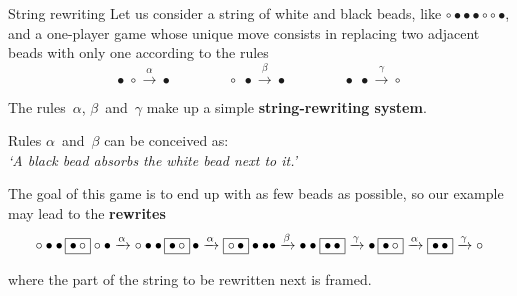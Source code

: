 %
\begin{frame}{String rewriting}
  Let us consider a string of white and black beads, like \(\circ
  \bullet \bullet \bullet \circ \circ \bullet\), and a one-player game
  whose unique move consists in replacing two adjacent beads with only
  one according to the rules
  \begin{equation*}
    \bullet \; \circ   \xrightarrow{\alpha} \bullet\qquad\qquad
    \circ   \; \bullet \xrightarrow{\beta} \bullet\qquad\qquad
    \bullet \; \bullet \xrightarrow{\gamma} \circ
  \end{equation*}

  The rules~\(\alpha\), \(\beta\)~and~\(\gamma\) make up a simple
  \textbf{string\hyp{}rewriting system}.

  \bigskip

  Rules \(\alpha\)~and~\(\beta\) can be conceived as:\\ \emph{`A black
  bead absorbs the white bead next to it.'}

  \bigskip

  The goal of this game is to end up with as few beads as possible, so
  our example may lead to the \textbf{rewrites}
  \begin{equation*}
    \circ \bullet \bullet \, \fbox{\(\bullet \, \circ\)} \circ \bullet
    \xrightarrow{\alpha} \circ \bullet \bullet \, \fbox{\(\bullet \,
      \circ\)} \, \bullet \xrightarrow{\alpha} \fbox{\(\circ \,
      \bullet\)} \bullet \bullet \bullet \xrightarrow{\beta} \bullet
    \bullet \fbox{\(\bullet \, \bullet\)} \xrightarrow{\gamma} \bullet \,
    \fbox{\(\bullet \, \circ\)} \xrightarrow{\alpha} \fbox{\(\bullet
      \, \bullet\)} \xrightarrow{\gamma} \circ
  \end{equation*}

  \medskip

  \noindent where the part of the string to be rewritten next is
  framed.

\end{frame}


